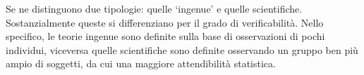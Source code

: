 \documentclass{subfiles}
\begin{document}
Se ne distinguono due tipologie: quelle `ingenue' e quelle scientifiche.
Sostanzialmente queste si differenziano per il grado di verificabilità.
Nello specifico, le teorie ingenue sono definite sulla base di osservazioni di pochi individui,
viceversa quelle scientifiche sono definite osservando un gruppo ben più ampio di soggetti, da cui una maggiore attendibilità statistica.
\end{document}
